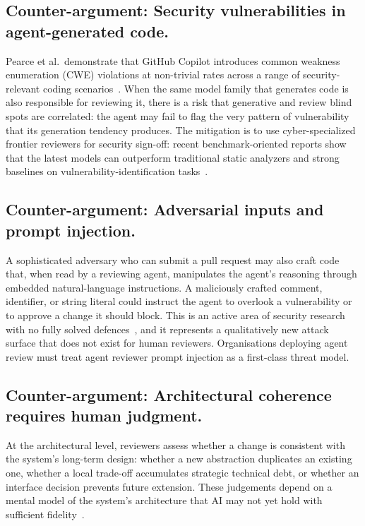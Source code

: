 \documentclass[10pt,conference]{IEEEtran}
\begin{document}
\subsection{Counter-argument: Security vulnerabilities in agent-generated code.}
Pearce et al.\ demonstrate that GitHub Copilot introduces common weakness enumeration (CWE) violations at non-trivial rates across a range of security-relevant coding scenarios~\cite{pearce2022asleep}.
When the same model family that generates code is also responsible for reviewing it, there is a risk that generative and review blind spots are correlated: the agent may fail to flag the very pattern of vulnerability that its generation tendency produces.
The mitigation is to use cyber-specialized frontier reviewers for security sign-off: recent benchmark-oriented reports show that the latest models can outperform traditional static analyzers and strong baselines on vulnerability-identification tasks~\cite{yildiz2025jitvul,berkeley2025frontiercyberblog}.

\subsection{Counter-argument: Adversarial inputs and prompt injection.}
A sophisticated adversary who can submit a pull request may also craft code that, when read by a reviewing agent, manipulates the agent's reasoning through embedded natural-language instructions.
A maliciously crafted comment, identifier, or string literal could instruct the agent to overlook a vulnerability or to approve a change it should block.
This is an active area of security research with no fully solved defences~\cite{greshake2023indirect}, and it represents a qualitatively new attack surface that does not exist for human reviewers.
Organisations deploying agent review must treat agent reviewer prompt injection as a first-class threat model.



\subsection{Counter-argument: Architectural coherence requires human judgment.}
At the architectural level, reviewers assess whether a change is consistent with the system's long-term design: whether a new abstraction duplicates an existing one, whether a local trade-off accumulates strategic technical debt, or whether an interface decision prevents future extension.
These judgements depend on a mental model of the system's architecture that AI may not yet hold with sufficient fidelity~\cite{bacchelli2013expectations}.
\end{document}
